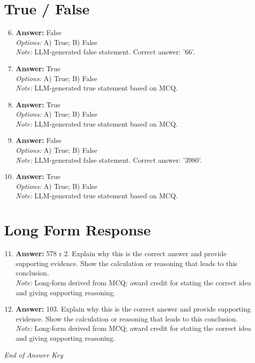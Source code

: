 \documentclass[12pt]{article}
\begin{document}
\section*{True / False}
\begin{enumerate}[label=\arabic*.]
\setcounter{enumi}{5}
\item \textbf{Answer:} False
\\ \textit{Options:} A) True; B) False
\\ \textit{Note:} LLM-generated false statement. Correct answer: '66'.
\item \textbf{Answer:} True
\\ \textit{Options:} A) True; B) False
\\ \textit{Note:} LLM-generated true statement based on MCQ.
\item \textbf{Answer:} True
\\ \textit{Options:} A) True; B) False
\\ \textit{Note:} LLM-generated true statement based on MCQ.
\item \textbf{Answer:} False
\\ \textit{Options:} A) True; B) False
\\ \textit{Note:} LLM-generated false statement. Correct answer: '3980'.
\item \textbf{Answer:} True
\\ \textit{Options:} A) True; B) False
\\ \textit{Note:} LLM-generated true statement based on MCQ.
\end{enumerate}

\section*{Long Form Response}
\begin{enumerate}[label=\arabic*.]
\setcounter{enumi}{10}
\item \textbf{Answer:} 578 r 2. Explain why this is the correct answer and provide supporting evidence. Show the calculation or reasoning that leads to this conclusion.
\\ \textit{Note:} Long-form derived from MCQ; award credit for stating the correct idea and giving supporting reasoning.
\item \textbf{Answer:} 103. Explain why this is the correct answer and provide supporting evidence. Show the calculation or reasoning that leads to this conclusion.
\\ \textit{Note:} Long-form derived from MCQ; award credit for stating the correct idea and giving supporting reasoning.
\end{enumerate}

\vfill
\noindent\textit{End of Answer Key}
\end{document}
